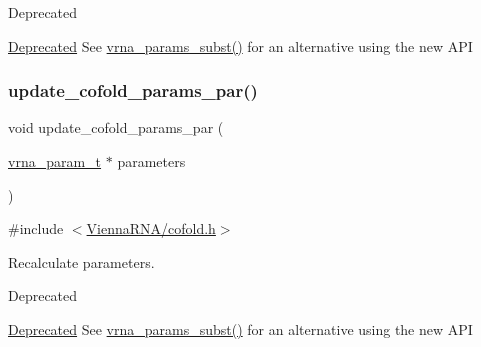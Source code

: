 \begin{DoxyRefDesc}{Deprecated}
\item[\mbox{\hyperlink{deprecated__deprecated000033}{Deprecated}}]See \mbox{\hyperlink{group__energy__parameters_ga5d1909208f7ea3baa98b75afaa1f62ca}{vrna\+\_\+params\+\_\+subst()}} for an alternative using the new A\+PI\end{DoxyRefDesc}
\mbox{\label{group__mfe__global__deprecated_gaaadbd28b4e428710529ab4098fdacad3}} 
\subsubsection{\texorpdfstring{update\_cofold\_params\_par()}{update\_cofold\_params\_par()}}
{\footnotesize\ttfamily void update\+\_\+cofold\+\_\+params\+\_\+par (\begin{DoxyParamCaption}\item[{\mbox{\hyperlink{group__energy__parameters_ga8a69ca7d787e4fd6079914f5343a1f35}{vrna\+\_\+param\+\_\+t}} $\ast$}]{parameters }\end{DoxyParamCaption})}



{\ttfamily \#include $<$\mbox{\hyperlink{cofold_8h}{Vienna\+R\+N\+A/cofold.\+h}}$>$}



Recalculate parameters. 

\begin{DoxyRefDesc}{Deprecated}
\item[\mbox{\hyperlink{deprecated__deprecated000034}{Deprecated}}]See \mbox{\hyperlink{group__energy__parameters_ga5d1909208f7ea3baa98b75afaa1f62ca}{vrna\+\_\+params\+\_\+subst()}} for an alternative using the new A\+PI\end{DoxyRefDesc}
\mbox{\label{group__mfe__global__deprecated_ga5f5bf4df35d0554f6ace9579f8744c48}} 
